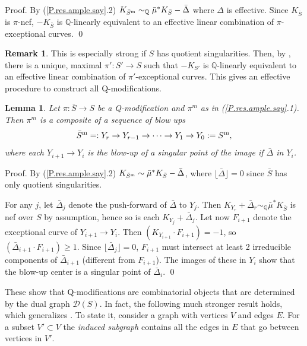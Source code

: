 \documentclass{amsart}
\newtheorem{lem}[thm]{Lemma}
\theoremstyle{definition}
\newtheorem{rem}[thm]{Remark}
\theoremstyle{remark}
\newcommand{\q}[0]{{\mathbb Q}}
\newcommand{\rdown}[1]{\lfloor{#1}\rfloor}
\newcommand{\simq}[0]{\sim_{\q}}
\begin{document}
Proof. By (\ref{P.res.ample.say}.2) $ K_{\bar S^{\rm m}}\simq  \bar\mu^* K_{\bar S}-\bar\Delta$ where $\Delta $ is effective. Since $K_{\bar S}$  is $\pi$-nef,
$-K_{\bar S}$  is $\q$-linearly equivalent to an effective linear combination of $\pi$-exceptional curves. \qed
\medskip

\begin{rem}  \label{antieff.lem.rem} This is especially strong if $S$ has quotient singularities. Then, by \cite[3.13]{ksb}, there is a unique, maximal
  $\pi':S'\to S$ such that $-K_{S'}$  is $\q$-linearly equivalent to an effective linear combination of $\pi'$-exceptional curves.
  This gives an effective procedure to construct all Q-modifications.
  \end{rem}


\begin{lem}\label{rigid.quot.mod.lem.1}
  Let $\pi:\bar S\to S$ be a Q-modification and  $\pi^m$ as in (\ref{P.res.ample.say}.1).
   Then   $\pi^m$ is a composite of a  
  sequence of blow ups
  $$
  \bar S^{\rm m}=:Y_r\to Y_{r-1}\to \cdots \to Y_1\to Y_0:= S^{\rm m},
  $$
  where each $Y_{i+1}\to Y_i$ is the blow-up of a singular point of the
  image if $\bar\Delta$ in $Y_i$.
\end{lem}

Proof. By (\ref{P.res.ample.say}.2)   $K_{\bar S^{\rm m}}\sim  \bar\mu^* K_{\bar S}-\bar\Delta$, 
 where
$\rdown{\bar\Delta}=0$ since $\bar S$ has only quotient singularities.

 For any $j$, let  $\bar\Delta_j$ denote the push-forward of $\bar\Delta$ to $Y_j$. Then   $K_{Y_r}+\bar\Delta_r\simq \bar\mu^* K_{\bar S}$ is nef over $S$
 by assumption, hence so is each
 $K_{Y_j}+\bar \Delta_j$.
 Let now $F_{i+1}$ denote the 
 exceptional curve of $Y_{i+1}\to Y_i$. Then $(K_{Y_{i+1}}\cdot F_{i+1})=-1$,
  so $(\bar \Delta_{i+1}\cdot F_{i+1})\geq 1$.  Since $\rdown{\bar\Delta_j}=0$, $F_{i+1}$ must intersect at least 2
  irreducible components of $\bar\Delta_{i+1}$ (different from $F_{i+1}$).
  The images of these in $Y_i$  show that the blow-up center is
  a singular point of $\bar\Delta_{i}$.
\qed





      

\medskip

These show that Q-modifications are combinatorial objects that are
determined by the dual graph ${\mathcal D}(S)$.
In fact, the following much stronger result holds, which generalizes  \cite[7.2]{MR1129040}.
To state it,
consider a graph with vertices $V$ and edges $E$. For a subset  $V'\subset V$ the  {\it induced 
  subgraph}  contains all the edges in $E$ that go  between vertices in $V'$.
\end{document}
